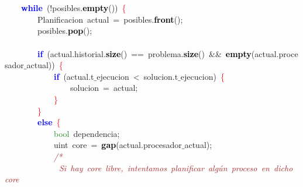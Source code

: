 \mbox{} \\
\mbox{} \\
\mbox{}\ \ \ \ \textbf{\textcolor{Blue}{while}}\ \textcolor{BrickRed}{(!}posibles\textcolor{BrickRed}{.}\textbf{\textcolor{Black}{empty}}\textcolor{BrickRed}{())}\ \textcolor{Red}{\{} \\
\mbox{}\ \ \ \ \ \ \ \ \textcolor{TealBlue}{Planificacion}\ actual\ \textcolor{BrickRed}{=}\ posibles\textcolor{BrickRed}{.}\textbf{\textcolor{Black}{front}}\textcolor{BrickRed}{();} \\
\mbox{}\ \ \ \ \ \ \ \ posibles\textcolor{BrickRed}{.}\textbf{\textcolor{Black}{pop}}\textcolor{BrickRed}{();} \\
\mbox{} \\
\mbox{}\ \ \ \ \ \ \ \ \textbf{\textcolor{Blue}{if}}\ \textcolor{BrickRed}{(}actual\textcolor{BrickRed}{.}historial\textcolor{BrickRed}{.}\textbf{\textcolor{Black}{size}}\textcolor{BrickRed}{()}\ \textcolor{BrickRed}{==}\ problema\textcolor{BrickRed}{.}\textbf{\textcolor{Black}{size}}\textcolor{BrickRed}{()}\ \textcolor{BrickRed}{\&\&}\ \textbf{\textcolor{Black}{empty}}\textcolor{BrickRed}{(}actual\textcolor{BrickRed}{.}procesador$\_$actual\textcolor{BrickRed}{))}\ \textcolor{Red}{\{} \\
\mbox{}\ \ \ \ \ \ \ \ \ \ \ \ \textbf{\textcolor{Blue}{if}}\ \textcolor{BrickRed}{(}actual\textcolor{BrickRed}{.}t$\_$ejecucion\ \textcolor{BrickRed}{\textless{}}\ solucion\textcolor{BrickRed}{.}t$\_$ejecucion\textcolor{BrickRed}{)}\ \textcolor{Red}{\{} \\
\mbox{}\ \ \ \ \ \ \ \ \ \ \ \ \ \ \ \ solucion\ \textcolor{BrickRed}{=}\ actual\textcolor{BrickRed}{;} \\
\mbox{}\ \ \ \ \ \ \ \ \ \ \ \ \textcolor{Red}{\}} \\
\mbox{}\ \ \ \ \ \ \ \ \textcolor{Red}{\}} \\
\mbox{}\ \ \ \ \ \ \ \ \textbf{\textcolor{Blue}{else}}\ \textcolor{Red}{\{} \\
\mbox{}\ \ \ \ \ \ \ \ \ \ \ \ \textcolor{ForestGreen}{bool}\ dependencia\textcolor{BrickRed}{;} \\
\mbox{}\ \ \ \ \ \ \ \ \ \ \ \ \textcolor{TealBlue}{uint}\ core\ \textcolor{BrickRed}{=}\ \textbf{\textcolor{Black}{gap}}\textcolor{BrickRed}{(}actual\textcolor{BrickRed}{.}procesador$\_$actual\textcolor{BrickRed}{);} \\
\mbox{}\ \ \ \ \ \ \ \ \ \ \ \ \textit{\textcolor{Brown}{/*}} \\
\mbox{}\textit{\textcolor{Brown}{\ \ \ \ \ \ \ \ \ \ \ \ \ Si\ hay\ core\ libre,\ intentamos\ planificar\ algún\ proceso\ en\ dicho\ core}} \\
